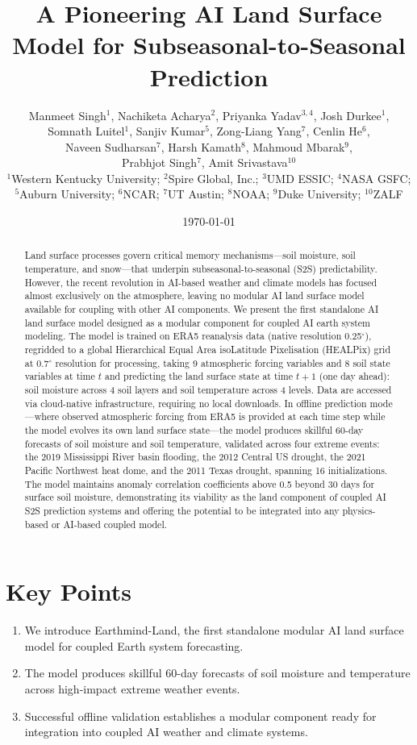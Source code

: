 \documentclass[11pt]{article}
\title{A Pioneering AI Land Surface Model for Subseasonal-to-Seasonal Prediction}
\author{Manmeet Singh$^{1}$, Nachiketa Acharya$^{2}$, Priyanka Yadav$^{3,4}$, Josh Durkee$^{1}$, \\
Somnath Luitel$^{1}$, Sanjiv Kumar$^{5}$, Zong-Liang Yang$^{7}$, Cenlin He$^{6}$, \\
Naveen Sudharsan$^{7}$, Harsh Kamath$^{8}$, Mahmoud Mbarak$^{9}$, \\
Prabhjot Singh$^{7}$, Amit Srivastava$^{10}$ \\
\small $^{1}$Western Kentucky University; $^{2}$Spire Global, Inc.; $^{3}$UMD ESSIC; $^{4}$NASA GSFC; \\
\small $^{5}$Auburn University; $^{6}$NCAR; $^{7}$UT Austin; $^{8}$NOAA; $^{9}$Duke University; $^{10}$ZALF
}
\date{\today}
\begin{document}
\maketitle

\section*{Key Points}
\begin{enumerate}
    \item We introduce Earthmind-Land, the first standalone modular AI land surface model for coupled Earth system forecasting.
    \item The model produces skillful 60-day forecasts of soil moisture and temperature across high-impact extreme weather events.
    \item Successful offline validation establishes a modular component ready for integration into coupled AI weather and climate systems.
\end{enumerate}

\begin{abstract}
Land surface processes govern critical memory mechanisms---soil moisture, soil temperature, and snow---that underpin subseasonal-to-seasonal (S2S) predictability. However, the recent revolution in AI-based weather and climate models has focused almost exclusively on the atmosphere, leaving no modular AI land surface model available for coupling with other AI components. We present the first standalone AI land surface model designed as a modular component for coupled AI earth system modeling. The model is trained on ERA5 reanalysis data (native resolution 0.25$^\circ$), regridded to a global Hierarchical Equal Area isoLatitude Pixelisation (HEALPix) grid at 0.7$^\circ$ resolution for processing, taking 9 atmospheric forcing variables and 8 soil state variables at time $t$ and predicting the land surface state at time $t+1$ (one day ahead): soil moisture across 4 soil layers and soil temperature across 4 levels. Data are accessed via cloud-native infrastructure, requiring no local downloads. In offline prediction mode---where observed atmospheric forcing from ERA5 is provided at each time step while the model evolves its own land surface state---the model produces skillful 60-day forecasts of soil moisture and soil temperature, validated across four extreme events: the 2019 Mississippi River basin flooding, the 2012 Central US drought, the 2021 Pacific Northwest heat dome, and the 2011 Texas drought, spanning 16 initializations. The model maintains anomaly correlation coefficients above 0.5 beyond 30 days for surface soil moisture, demonstrating its viability as the land component of coupled AI S2S prediction systems and offering the potential to be integrated into any physics-based or AI-based coupled model.
\end{abstract}
\end{document}
